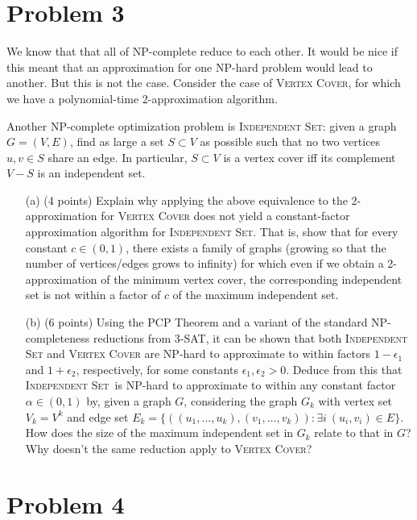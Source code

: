 \documentclass[12pt]{article}
\begin{document}
\section*{Problem 3}

We know that that all of NP-complete reduce to each other.  It would be nice if this meant that an approximation for one NP-hard problem would lead to another.  But this is not the case.  Consider the case of \textsc{Vertex Cover}, for which we have a polynomial-time 2-approximation algorithm.

Another NP-complete optimization problem is
\textsc{Independent Set}: given a graph $G=(V,E)$, find as large a set $S\subset V$ as possible such that no two vertices $u,v\in S$ share an edge. In particular, $S\subset V$ is a vertex cover iff its complement $V-S$ is an independent set.

\begin{itemize}
\item[(a)] (4 points) Explain why applying the above equivalence to the 2-approximation for \textsc{Vertex Cover} does not yield a constant-factor approximation algorithm for \textsc{Independent Set}.
That is, show that for every constant $c\in (0,1)$, there exists a family of graphs (growing so that the number of vertices/edges grows to infinity) for which even if we obtain a 2-approximation of the minimum vertex cover, the corresponding independent set is not within a factor of $c$ of the maximum independent set.

\item[(b)] (6 points) Using the PCP Theorem and a variant of the standard NP-completeness reductions from 3-SAT, it can be shown that both \textsc{Independent Set} and \textsc{Vertex Cover} are NP-hard to approximate to within factors $1-\epsilon_1$ and $1+\epsilon_2$, respectively, for some constants $\epsilon_1,\epsilon_2>0$. Deduce from this that \textsc{Independent Set}\ is NP-hard to approximate to within any constant factor $\alpha\in (0,1)$ by, given a graph $G$, considering the graph $G_k$ with vertex set $V_k=V^k$ and edge set $E_k=\{((u_1,\ldots,u_k),(v_1,\ldots,v_k)) : \exists i\ (u_i,v_i)\in E\}$. How does the size of the maximum independent set in $G_k$ relate to that in $G$? Why doesn't the same reduction apply to \textsc{Vertex Cover}?
\end{itemize}


\section*{Problem 4}
\end{document}
